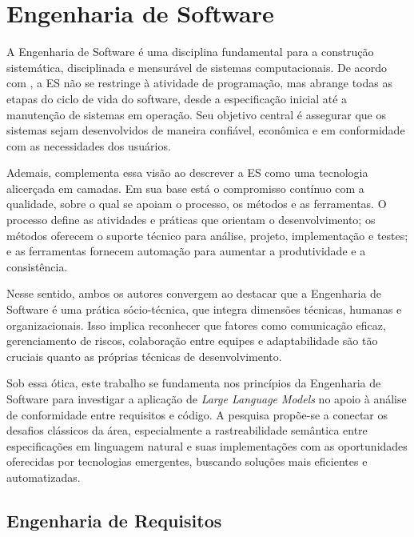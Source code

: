 


\section{Engenharia de Software}

A Engenharia de Software é uma disciplina fundamental para a construção sistemática, disciplinada e mensurável de sistemas computacionais. De acordo com , a ES não se restringe à atividade de programação, mas abrange todas as etapas do ciclo de vida do software, desde a especificação inicial até a manutenção de sistemas em operação. Seu objetivo central é assegurar que os sistemas sejam desenvolvidos de maneira confiável, econômica e em conformidade com as necessidades dos usuários.

Ademais,  complementa essa visão ao descrever a ES como uma tecnologia alicerçada em camadas. Em sua base está o compromisso contínuo com a qualidade, sobre o qual se apoiam o processo, os métodos e as ferramentas. O processo define as atividades e práticas que orientam o desenvolvimento; os métodos oferecem o suporte técnico para análise, projeto, implementação e testes; e as ferramentas fornecem automação para aumentar a produtividade e a consistência.

Nesse sentido, ambos os autores convergem ao destacar que a Engenharia de Software é uma prática sócio-técnica, que integra dimensões técnicas, humanas e organizacionais. Isso implica reconhecer que fatores como comunicação eficaz, gerenciamento de riscos, colaboração entre equipes e adaptabilidade são tão cruciais quanto as próprias técnicas de desenvolvimento.

Sob essa ótica, este trabalho se fundamenta nos princípios da Engenharia de Software para investigar a aplicação de \textit{Large Language Models}  no apoio à análise de conformidade entre requisitos e código. A pesquisa propõe-se a conectar os desafios clássicos da área, especialmente a rastreabilidade semântica entre especificações em linguagem natural e suas implementações com as oportunidades oferecidas por tecnologias emergentes, buscando soluções mais eficientes e automatizadas.

\subsection{Engenharia de Requisitos}

